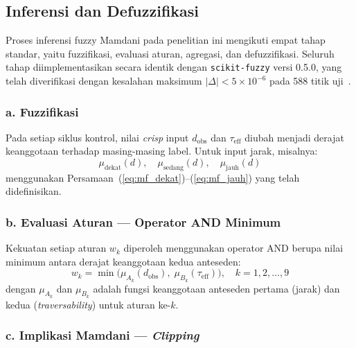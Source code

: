 \subsection{Inferensi dan Defuzzifikasi}
\label{sec:fuzzy_infer}

Proses inferensi fuzzy Mamdani pada penelitian ini mengikuti empat tahap standar, yaitu fuzzifikasi, evaluasi aturan, agregasi, dan defuzzifikasi. Seluruh tahap diimplementasikan secara identik dengan \texttt{scikit-fuzzy} versi 0.5.0, yang telah diverifikasi dengan kesalahan maksimum $|\Delta| < 5 \times 10^{-6}$ pada 588 titik uji~\cite{Mamdani1974}.

\subsubsection*{a. Fuzzifikasi}

Pada setiap siklus kontrol, nilai \textit{crisp} input $d_\text{obs}$ dan $\tau_\text{eff}$ diubah menjadi derajat keanggotaan terhadap masing-masing label. Untuk input jarak, misalnya:
\begin{equation}
    \mu_\text{dekat}(d),\quad \mu_\text{sedang}(d),\quad \mu_\text{jauh}(d)
    \label{eq:fuzz_input}
\end{equation}
menggunakan Persamaan~(\ref{eq:mf_dekat})--(\ref{eq:mf_jauh}) yang telah didefinisikan.

\subsubsection*{b. Evaluasi Aturan --- Operator AND Minimum}

Kekuatan setiap aturan $w_k$ diperoleh menggunakan operator AND berupa nilai minimum antara derajat keanggotaan kedua anteseden:
\begin{equation}
    w_k = \min\!\bigl(\mu_{A_k}(d_\text{obs}),\; \mu_{B_k}(\tau_\text{eff})\bigr),
    \quad k = 1, 2, \ldots, 9
    \label{eq:rule_strength}
\end{equation}
dengan $\mu_{A_k}$ dan $\mu_{B_k}$ adalah fungsi keanggotaan anteseden pertama (jarak) dan kedua (\textit{traversability}) untuk aturan ke-$k$.

\subsubsection*{c. Implikasi Mamdani --- \textit{Clipping}}

